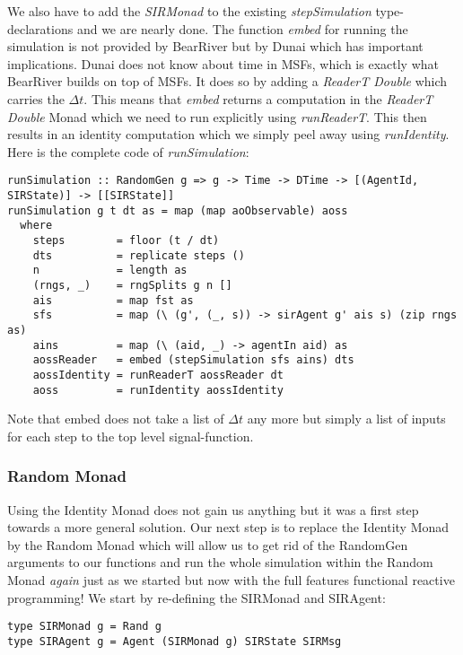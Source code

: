 We also have to add the \textit{SIRMonad} to the existing \textit{stepSimulation} type-declarations and we are nearly done. The function \textit{embed} for running the simulation is not provided by BearRiver but by Dunai which has important implications. Dunai does not know about time in MSFs, which is exactly what BearRiver builds on top of MSFs. It does so by adding a \textit{ReaderT Double} which carries the $\Delta t$. This means that \textit{embed} returns a computation in the \textit{ReaderT Double} Monad which we need to run explicitly using \textit{runReaderT}. This then results in an identity computation which we simply peel away using \textit{runIdentity}. Here is the complete code of \textit{runSimulation}:

\begin{verbatim}
runSimulation :: RandomGen g => g -> Time -> DTime -> [(AgentId, SIRState)] -> [[SIRState]]
runSimulation g t dt as = map (map aoObservable) aoss
  where
    steps        = floor (t / dt)
    dts          = replicate steps ()
    n            = length as
    (rngs, _)    = rngSplits g n []
    ais          = map fst as
    sfs          = map (\ (g', (_, s)) -> sirAgent g' ais s) (zip rngs as)
    ains         = map (\ (aid, _) -> agentIn aid) as
    aossReader   = embed (stepSimulation sfs ains) dts
    aossIdentity = runReaderT aossReader dt
    aoss         = runIdentity aossIdentity
\end{verbatim}

Note that embed does not take a list of $\Delta t$ any more but simply a list of inputs for each step to the top level signal-function.

\subsubsection{Random Monad}
Using the Identity Monad does not gain us anything but it was a first step towards a more general solution. Our next step is to replace the Identity Monad by the Random Monad which will allow us to get rid of the RandomGen arguments to our functions and run the whole simulation within the Random Monad \textit{again} just as we started but now with the full features functional reactive programming!
We start by re-defining the SIRMonad and SIRAgent:

\begin{verbatim}
type SIRMonad g = Rand g
type SIRAgent g = Agent (SIRMonad g) SIRState SIRMsg
\end{verbatim}


